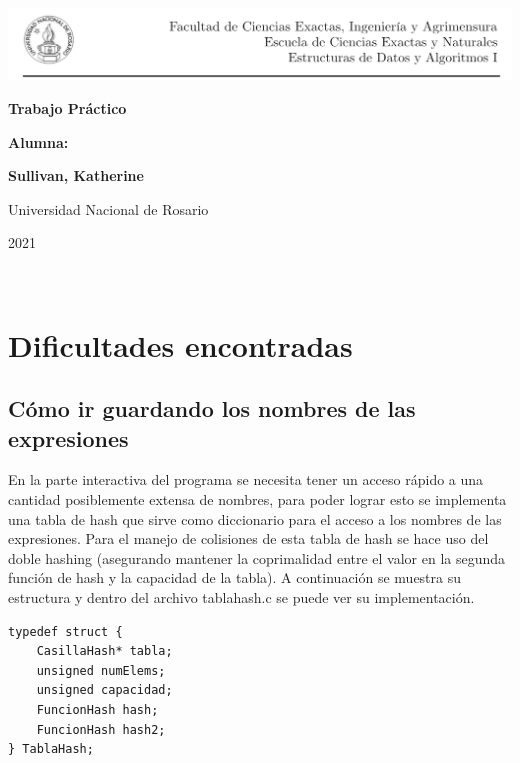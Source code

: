 \documentclass[11pt]{article}
\begin{document}
\begin{titlepage}
    \hspace{-1.2cm}\includegraphics[scale= 0.8]{header2.png}
    \begin{center}
        \vfill
        \vfill
            \vspace{0.7cm}
            \noindent\textbf{\Huge Trabajo Práctico}\par
            \vspace{.5cm}
        \vfill
        \noindent \textbf{\huge Alumna:}\par
        \vspace{.5cm}
        \noindent \textbf{\Large Sullivan, Katherine}\par
 
        \vfill
        \large Universidad Nacional de Rosario \par
        \noindent\large 2021
    \end{center}
\end{titlepage}
\

\section{Dificultades encontradas}

\subsection{C\'omo ir guardando los nombres de las expresiones}
En la parte interactiva del programa se necesita tener un acceso r\'apido a una cantidad posiblemente extensa de nombres, para poder lograr esto se implementa una tabla de hash que sirve como diccionario para el acceso a los nombres de las expresiones. Para el manejo de colisiones de esta tabla de hash se hace uso del doble hashing (asegurando mantener la coprimalidad entre el valor en la segunda función de hash y la capacidad de la tabla). 
A continuaci\'on se muestra su estructura y dentro del archivo tablahash.c se puede ver su implementaci\'on. 

\begin{lstlisting}[style = CStyle]
typedef struct {
    CasillaHash* tabla;
    unsigned numElems;
    unsigned capacidad;
    FuncionHash hash;
    FuncionHash hash2;
} TablaHash;
\end{lstlisting}
\end{document}
